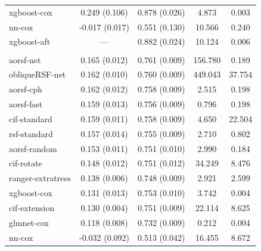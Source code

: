 \documentclass[twoside,11pt]{article}\usepackage[]{graphicx}\usepackage[]{xcolor}
\newenvironment{knitrout}{}{} %
\begin{document}
\begin{knitrout}
\begin{longtable}[t]{lcccc}
\hspace{1em}xgboost-cox & 0.249 (0.106) & 0.878 (0.026) & 4.873 & 0.003\\
\hspace{1em}nn-cox & -0.017 (0.017) & 0.551 (0.130) & 10.566 & 0.240\\
\hspace{1em}xgboost-aft & --- & 0.882 (0.024) & 10.124 & 0.006\\
\addlinespace[0.3em]
\multicolumn{5}{l}{\textit{\textbf{Rotterdam tumor bank; death, n = 2982, p = 11}}}\\
\hline
\hspace{1em}aorsf-net & 0.165 (0.012) & 0.761 (0.009) & 156.780 & 0.189\\
\hspace{1em}obliqueRSF-net & 0.162 (0.010) & 0.760 (0.009) & 449.043 & 37.754\\
\hspace{1em}aorsf-cph & 0.162 (0.012) & 0.758 (0.009) & 2.515 & 0.198\\
\hspace{1em}aorsf-fast & 0.159 (0.013) & 0.756 (0.009) & 0.796 & 0.198\\
\hspace{1em}cif-standard & 0.159 (0.011) & 0.758 (0.009) & 4.650 & 22.504\\
\hspace{1em}rsf-standard & 0.157 (0.014) & 0.755 (0.009) & 2.710 & 0.802\\
\hspace{1em}aorsf-random & 0.153 (0.011) & 0.751 (0.010) & 2.990 & 0.184\\
\hspace{1em}cif-rotate & 0.148 (0.012) & 0.751 (0.012) & 34.249 & 8.476\\
\hspace{1em}ranger-extratrees & 0.138 (0.006) & 0.748 (0.009) & 2.921 & 2.599\\
\hspace{1em}xgboost-cox & 0.131 (0.013) & 0.753 (0.010) & 3.742 & 0.004\\
\hspace{1em}cif-extension & 0.130 (0.004) & 0.751 (0.009) & 22.114 & 8.625\\
\hspace{1em}glmnet-cox & 0.118 (0.008) & 0.732 (0.009) & 0.212 & 0.004\\
\hspace{1em}nn-cox & -0.032 (0.092) & 0.513 (0.042) & 16.455 & 8.672\\

\end{longtable}
\end{knitrout}
\end{document}
